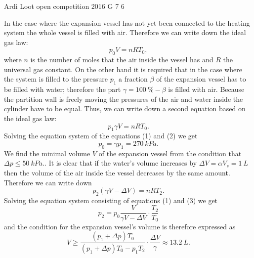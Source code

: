 \documentclass[11pt]{article}
\begin{document}
{Ardi Loot} %
{open competition} %
{2016} %
{G 7} %
{6} %
{

\ifEngSolution
In the case where the expansion vessel has not yet been connected to the heating system the whole vessel is filled with air. Therefore we can write down the ideal gas law:
\begin{equation}
p_{0}V=nRT_{0},\label{eq:2016-lahg-07-paisupaak-eq1}
\end{equation} 
where $n$ is the number of moles that the air inside the vessel has and $R$ the universal gas constant. On the other hand it is required that in the case where the system is filled to the pressure $p_{1}$ a fraction $\beta$ of the expansion vessel has to be filled with water; therefore the part $\gamma=\SI{100}{\%}-\beta$ is filled with air. Because the partition wall is freely moving the pressures of the air and water inside the cylinder have to be equal. Thus, we can write down a second equation based on the ideal gas law:
\begin{equation}
p_{1}\gamma V=nRT_{0}.\label{eq:2016-lahg-07-paisupaak-eq2}
\end{equation} 
Solving the equation system of the equations (1) and (2) we get
\[
p_{0}=\gamma p_{1}=\SI{270}{kPa}.
\] 
We find the minimal volume $V$ of the expansion vessel from the condition that $\Delta p\leq\SI{50}{kPa}.$. It is clear that if the water’s volume increases by $\Delta V=\alpha V_{s}=\SI{1}{L}$ then the volume of the air inside the vessel decreases by the same amount. Therefore we can write down
\begin{equation}
p_{2}\left(\gamma V-\Delta V\right)=nRT_{2}.\label{eq:2016-lahg-07-paisupaak-eq3}
\end{equation} 
Solving the equation system consisting of equations (1) and (3) we get
\[
p_{2}=p_{0}\frac{V}{\gamma V-\Delta V}\cdot\frac{T_{2}}{T_{0}}
\] 
and the condition for the expansion vessel’s volume is therefore expressed as 
\[
V\geq\frac{\left(p_{1}+\Delta p\right)T_{0}}{\left(p_{1}+\Delta p\right)T_{0}-p_{1}T_{2}}\cdot\frac{\Delta V}{\gamma}\approx\SI{13.2}{L}.
\]
\fi
}
\end{document}

